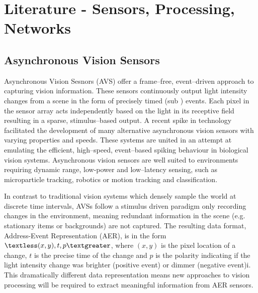 \chapter{Literature - Sensors, Processing, Networks}


\section{Asynchronous Vision Sensors}  %
Asynchronous Vision Sesnors (AVS) offer a frame--free, event--driven approach to capturing vision information\cite{delbruck2010activity}. 
These sensors continuously output light intensity changes from a scene in the form of precisely timed (sub \ms) events. 
Each pixel in the sensor array acts independently based on the light in its receptive field resulting in a sparse, stimulus--based output. 
A recent spike in technology facilitated the development of many alternative asynchronous vision sensors with varying properties and speeds\cite{delbruck2014research}.
These systems are united in an attempt at emulating the efficient, high--speed, event--based spiking behaviour in biological vision systems\cite{delbruck2010activity}.
Asynchronous vision sensors are well suited to environments requiring dynamic range, low-power and low--latency sensing, such as microparticle tracking\cite{ni2012asynchronous}, robotics\cite{roboGoalie2013} or motion tracking and classification\cite{Lee2014, reverter2015neuromorphic}.

In contrast to traditional vision systems which densely sample the world at discrete time intervals, AVSs follow a stimulus driven paradigm only recording changes in the environment, meaning redundant information in the scene (e.g. stationary items or backgrounds) are not captured.  
The resulting data format, Address-Event Representation (AER)\cite{mahowald1992vlsi}, is in the form $\textless (x, y), t, p \textgreater$, where $(x, y)$ is the pixel location of a change, $t$ is the precise time of the change and $p$ is the polarity indicating if the light intensity change was brighter (positive event) or dimmer (negative event)i\cite{delbruck2010activity}. 
This dramatically different data representation means new approaches to vision processing will be required to extract meaningful information from AER sensors\cite{akolkar2015can}. 

